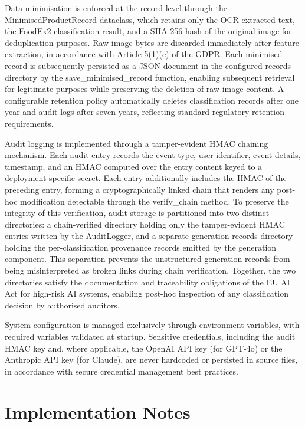 Data minimisation is enforced at the record level through the MinimisedProductRecord dataclass, which retains only the OCR-extracted text, the FoodEx2 classification result, and a SHA-256 hash of the original image for deduplication purposes. Raw image bytes are discarded immediately after feature extraction, in accordance with Article 5(1)(c) of the GDPR. Each minimised record is subsequently persisted as a JSON document in the configured records directory by the save\_minimised\_record function, enabling subsequent retrieval for legitimate purposes while preserving the deletion of raw image content. A configurable retention policy automatically deletes classification records after one year and audit logs after seven years, reflecting standard regulatory retention requirements.

Audit logging is implemented through a tamper-evident HMAC chaining mechanism. Each audit entry records the event type, user identifier, event details, timestamp, and an HMAC computed over the entry content keyed to a deployment-specific secret. Each entry additionally includes the HMAC of the preceding entry, forming a cryptographically linked chain that renders any post-hoc modification detectable through the verify\_chain method. To preserve the integrity of this verification, audit storage is partitioned into two distinct directories: a chain-verified directory holding only the tamper-evident HMAC entries written by the AuditLogger, and a separate generation-records directory holding the per-classification provenance records emitted by the generation component. This separation prevents the unstructured generation records from being misinterpreted as broken links during chain verification. Together, the two directories satisfy the documentation and traceability obligations of the EU AI Act for high-risk AI systems, enabling post-hoc inspection of any classification decision by authorised auditors.

System configuration is managed exclusively through environment variables, with required variables validated at startup. Sensitive credentials, including the audit HMAC key and, where applicable, the OpenAI API key (for GPT-4o) or the Anthropic API key (for Claude), are never hardcoded or persisted in source files, in accordance with secure credential management best practices.

\hypertarget{implementation-notes}{%
\section{Implementation Notes}\label{implementation-notes}}

